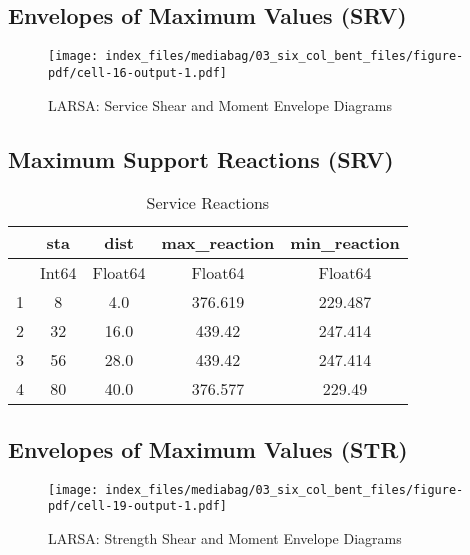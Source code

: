 \documentclass[
  letterpaper,
  DIV=11,
  numbers=noendperiod]{scrreprt}
\begin{document}
\subsection{Envelopes of Maximum Values
(SRV)}\label{envelopes-of-maximum-values-srv-4}

\begin{figure}[H]

{\centering \texttt{[image: index\_files/mediabag/03\_six\_col\_bent\_files/figure-pdf/cell-16-output-1.pdf]}

}

\caption{LARSA: Service Shear and Moment Envelope Diagrams}

\end{figure}%

\subsection{Maximum Support Reactions
(SRV)}\label{maximum-support-reactions-srv-4}

\begin{table}
\caption{Service Reactions}\tabularnewline

\centering
\begin{tabular}{r|cccc}
    & sta & dist & max\_reaction & min\_reaction\\
    \hline
    & Int64 & Float64 & Float64 & Float64\\
    \hline
    1 & 8 & 4.0 & 376.619 & 229.487 \\
    2 & 32 & 16.0 & 439.42 & 247.414 \\
    3 & 56 & 28.0 & 439.42 & 247.414 \\
    4 & 80 & 40.0 & 376.577 & 229.49 \\
\end{tabular}
\end{table}

\subsection{Envelopes of Maximum Values
(STR)}\label{envelopes-of-maximum-values-str-4}

\begin{figure}[H]

{\centering \texttt{[image: index\_files/mediabag/03\_six\_col\_bent\_files/figure-pdf/cell-19-output-1.pdf]}

}

\caption{LARSA: Strength Shear and Moment Envelope Diagrams}

\end{figure}%
\end{document}
